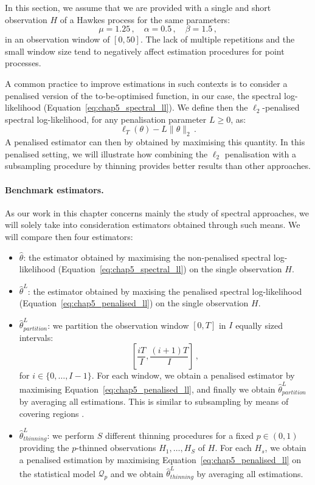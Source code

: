     In this section, we assume that we are provided with a single and short observation $H$ of a Hawkes process for the same parameters:
    \[\mu = 1.25\,,\quad \alpha = 0.5\,,\quad \beta = 1.5\,,\]
    in an observation window of $[0, 50]$.
    The lack of multiple repetitions and the small window size tend to negatively affect estimation procedures for point processes.

    A common practice to improve estimations in such contexts is to consider a penalised version of the to-be-optimised function, in our case, the spectral log-likelihood (Equation~\eqref{eq:chap5_spectral_ll}). 
    We define then the $\ell_2$-penalised spectral log-likelihood, for any penalisation parameter $L\geq0$, as:
    \begin{equation}\label{eq:chap5_penalised_ll}
        \ell_{T}(\theta) - L \|\theta\|_2 \,.
    \end{equation}
    A penalised estimator can then by obtained by maximising this quantity.
    In this penalised setting, we will illustrate how combining the $\ell_2$ penalisation with a subsampling procedure by thinning provides better results than other approaches.

    \paragraph{Benchmark estimators.} As our work in this chapter concerns mainly the study of spectral approaches, we will solely take into consideration estimators obtained through such means.
    We will compare then four estimators:
    
    \begin{itemize}
        \item $\hat \theta$: the estimator obtained by maximising the non-penalised spectral log-likelihood (Equation~\eqref{eq:chap5_spectral_ll}) on the single observation $H$.
        \item $\hat \theta^L$: the estimator obtained by maxising the penalised spectral log-likelihood (Equation~\eqref{eq:chap5_penalised_ll}) on the single observation $H$.
        \item $\hat \theta^L_{partition}$: we partition the observation window $[0,T]$ in $I$ equally sized intervals: \[\left[\frac{iT}{I}, \frac{(i+1)T}{I}\right]\,,\] for $i\in\{0,\ldots, I-1\}$. For each window, we obtain a penalised estimator by maximising Equation~\eqref{eq:chap5_penalised_ll}, and finally we obtain $\hat \theta^L_{partition}$ by averaging all estimations. This is similar to subsampling by means of covering regions \parencite{Possolo1991, Politis1999, Guan2007}.
        \item $\hat \theta^L_{thinning}$: we perform $S$ different thinning procedures for a fixed $p\in(0,1)$ providing the $p$-thinned observations $H_1, \ldots, H_S$ of $H$. For each $H_s$, we obtain a penalised estimation by maximising Equation~\eqref{eq:chap5_penalised_ll} on the statistical model $\mathcal{Q}_p$ and we obtain $\hat \theta^L_{thinning}$ by averaging all estimations.
    \end{itemize}

